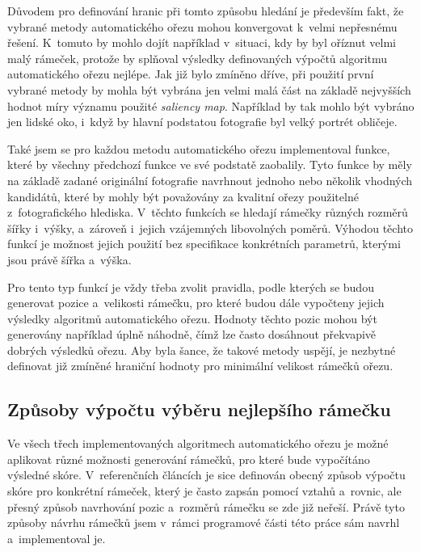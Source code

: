 Důvodem pro definování hranic při tomto způsobu hledání je především fakt, že vybrané metody automatického ořezu mohou konvergovat k~velmi nepřesnému řešení. K~tomuto by mohlo dojít například v~situaci, kdy by byl oříznut velmi malý rámeček, protože by splňoval výsledky definovaných výpočtů algoritmu automatického ořezu nejlépe. Jak již bylo zmíněno dříve, při použití první vybrané metody\cite{Stentiford2007} by mohla být vybrána jen velmi malá část na základě nejvyšších hodnot míry významu použité \emph{saliency map}. Například by tak mohlo být vybráno jen lidské oko, i~když by hlavní podstatou fotografie byl velký portrét obličeje.

Také jsem se pro každou metodu automatického ořezu implementoval funkce, které by všechny předchozí funkce ve své podstatě zaobalily. Tyto funkce by měly na základě zadané originální fotografie navrhnout jednoho nebo několik vhodných kandidátů, které by mohly být považovány za kvalitní ořezy použitelné z~fotografického hlediska. V~těchto funkcích se hledají rámečky různých rozměrů šířky i~výšky, a~zároveň i~jejich vzájemných libovolných poměrů. Výhodou těchto funkcí je možnost jejich použití bez specifikace konkrétních parametrů, kterými jsou právě šířka a~výška.

Pro tento typ funkcí je vždy třeba zvolit pravidla, podle kterých se budou generovat pozice a~velikosti rámečku, pro které budou dále vypočteny jejich výsledky algoritmů automatického ořezu. Hodnoty těchto pozic mohou být generovány například úplně náhodně, čímž lze často dosáhnout překvapivě dobrých výsledků ořezu. Aby byla šance, že takové metody uspějí, je nezbytné definovat již zmíněné hraniční hodnoty pro minimální velikost rámečků ořezu. 

\subsection{Způsoby výpočtu výběru nejlepšího rámečku}
Ve všech třech implementovaných algoritmech automatického ořezu \cite{Fang2014,Stentiford2007,Suh2003} je možné aplikovat různé možnosti generování rámečků, pro které bude vypočítáno výsledné skóre. V~referenčních článcích je sice definován obecný způsob výpočtu skóre pro konkrétní rámeček, který je často zapsán pomocí vztahů a~rovnic, ale přesný způsob navrhování pozic a~rozměrů rámečku se zde již neřeší. Právě tyto způsoby návrhu rámečků jsem v~rámci programové části této práce sám navrhl a~implementoval je.

